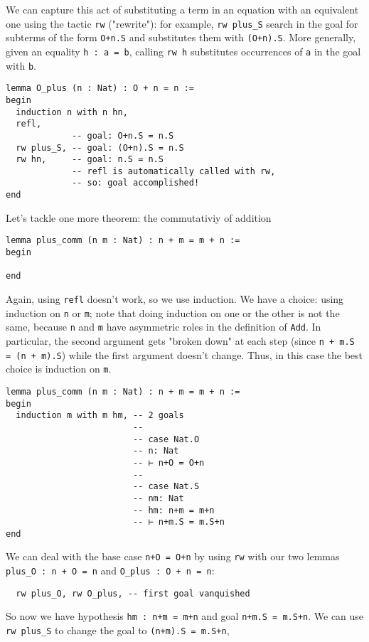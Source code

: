 \documentclass{book}
\theoremstyle{definition}
\theoremstyle{remark}
\theoremstyle{plain}
\begin{document}
We can capture this act of substituting a term in an equation with an equivalent one using the tactic \lstinline{rw} ("rewrite"):
for example, \lstinline{rw plus_S} search in the goal for subterms of the form \lstinline{O+n.S} and substitutes them with \lstinline{(O+n).S}.
More generally, given an equality \lstinline{h : a = b}, calling \lstinline{rw h} substitutes occurrences of \lstinline{a} in the goal with \lstinline{b}.
\begin{lstlisting}
lemma O_plus (n : Nat) : O + n = n :=
begin
  induction n with n hn,
  refl,
             -- goal: O+n.S = n.S
  rw plus_S, -- goal: (O+n).S = n.S
  rw hn,     -- goal: n.S = n.S
             -- refl is automatically called with rw,
             -- so: goal accomplished!
end
\end{lstlisting}
Let's tackle one more theorem: the commutativiy of addition
\begin{lstlisting}
lemma plus_comm (n m : Nat) : n + m = m + n :=
begin

end
\end{lstlisting}
Again, using \lstinline{refl} doesn't work, so we use induction.
We have a choice: using induction on \lstinline{n} or \lstinline{m};
note that doing induction on one or the other is not the same,
because \lstinline{n} and \lstinline{m} have asymmetric roles in the definition of \lstinline{Add}.
In particular, the second argument gets "broken down" at each step
(since \lstinline{n + m.S = (n + m).S}) while the first argument doesn't change.
Thus, in this case the best choice is induction on \lstinline{m}.
\begin{lstlisting}
lemma plus_comm (n m : Nat) : n + m = m + n :=
begin
  induction m with m hm, -- 2 goals
                         -- 
                         -- case Nat.O
                         -- n: Nat
                         -- ⊢ n+O = O+n
                         --
                         -- case Nat.S
                         -- nm: Nat
                         -- hm: n+m = m+n
                         -- ⊢ n+m.S = m.S+n
end
\end{lstlisting}
We can deal with the base case \lstinline{n+O = O+n} by using \lstinline{rw} with our two lemmas
\lstinline{plus_O : n + O = n} and \lstinline{O_plus : O + n = n}:
\begin{lstlisting}
  rw plus_O, rw O_plus, -- first goal vanquished
\end{lstlisting}
So now we have hypothesis \lstinline{hm : n+m = m+n} and goal \lstinline{n+m.S = m.S+n}.
We can use \lstinline{rw plus_S} to change the goal to \lstinline{(n+m).S = m.S+n},
\end{document}
